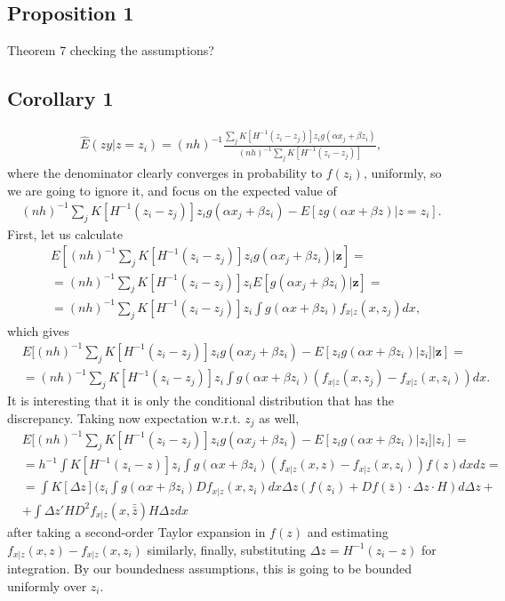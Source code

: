 \documentclass{article}
\theoremstyle{definition}
\theoremstyle{remark}
\begin{document}
\subsection{Proposition 1}
Theorem 7 checking the assumptions?

\subsection{Corollary 1}
\begin{align}
\hat{E}(zy|z=z_i)= (nh)^{-1}\frac{\sum_j K[H^{-1}(z_i-z_j)] z_i g(\alpha x_j + \beta z_i)}{(nh)^{-1}\sum_j K[H^{-1}(z_i-z_j)]},
\end{align}
where the denominator clearly converges in probability to $f(z_i)$, uniformly, so we are going to ignore it, and focus on the expected value of
\begin{align}
(nh)^{-1}\sum_j K[H^{-1}(z_i-z_j)] z_i g(\alpha x_j + \beta z_i)-E[z g(\alpha x + \beta z)|z=z_i].
\end{align}
First, let us calculate
\begin{align}
&E[(nh)^{-1}\sum_j K[H^{-1}(z_i-z_j)] z_i g(\alpha x_j + \beta z_i)|\mathbf{z}]= \\
&=(nh)^{-1}\sum_j K[H^{-1}(z_i-z_j)] z_i E[g(\alpha x_j + \beta z_i)|\mathbf{z}]= \nonumber \\
&= (nh)^{-1}\sum_j K[H^{-1}(z_i-z_j)] z_i \int g(\alpha x + \beta z_i) f_{x|z}(x,z_j) dx,\nonumber
\end{align}
which gives
\begin{align}
&E[(nh)^{-1}\sum_j K[H^{-1}(z_i-z_j)] z_i g(\alpha x_j + \beta z_i)-E[z_i g(\alpha x + \beta z_i)|z_i]|\mathbf{z}]= \\
&=(nh)^{-1}\sum_j K[H^{-1}(z_i-z_j)] z_i \int g(\alpha x + \beta z_i) (f_{x|z}(x,z_j)-f_{x|z}(x,z_i)) dx. \nonumber
\end{align}
It is interesting that it is only the conditional distribution that has the discrepancy. Taking now expectation w.r.t. $z_j$ as well,
\begin{align}
&E[(nh)^{-1}\sum_j K[H^{-1}(z_i-z_j)] z_i g(\alpha x_j + \beta z_i)-E[z_i g(\alpha x + \beta z_i)|z_i]|z_i]= \\
&=h^{-1}\int K[H^{-1}(z_i-z)] z_i \int g(\alpha x + \beta z_i) (f_{x|z}(x,z)-f_{x|z}(x,z_i)) f(z) dxdz= \nonumber \\
&= \int K[\Delta z] (z_i \int g(\alpha x+\beta z_i)Df_{x|z}(x,z_i) dx \Delta z (f(z_i) + Df(\bar{z})\cdot \Delta z \cdot H ) d \Delta z + \nonumber\\
&+ \int \Delta z' H  D^2f_{x|z}(x,\bar{\bar{z}})H \Delta z dx \nonumber
\end{align}
after taking a second-order Taylor expansion in $f(z)$ and estimating $f_{x|z}(x,z)-f_{x|z}(x,z_i)$ similarly, finally, substituting $\Delta z= H^{-1}(z_i-z)$ for integration. By our boundedness assumptions, this is going to be bounded uniformly over $z_i$.
\end{document}
